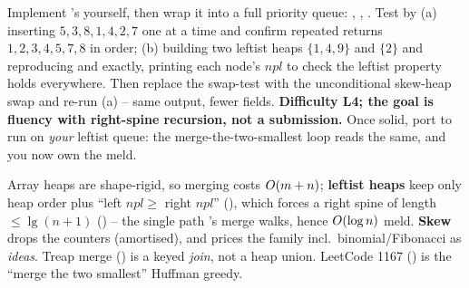 \begin{notebox}
Implement 's  yourself, then wrap it into a full priority queue:
, , . Test by (a) inserting $5,3,8,1,4,2,7$ one at a time and
confirm repeated  returns $1,2,3,4,5,7,8$ in order; (b) building two leftist heaps
$\{1,4,9\}$ and $\{2\}$ and reproducing  and  exactly, printing
each node's $\mathit{npl}$ to check the leftist property holds everywhere. Then replace the swap-test with
the unconditional skew-heap swap and re-run (a) -- same output, fewer fields. \textbf{Difficulty L4; the goal
is fluency with right-spine recursion, not a submission.} Once solid, port  to run on
\emph{your} leftist queue: the merge-the-two-smallest loop reads the same, and you now own the meld.
\end{notebox}

\begin{recallbox}
Array heaps are shape-rigid, so merging costs $O(m+n)$; \textbf{leftist heaps} keep only heap order plus
``left $\mathit{npl}\ge$ right $\mathit{npl}$'' (), which forces a right spine of length
$\le\lg(n+1)$ () -- the single path 's merge walks, hence
$O(\log n)$ meld. \textbf{Skew} drops the counters (amortised), and  prices the
family incl.\ binomial/Fibonacci as \emph{ideas}. Treap merge () is a keyed \emph{join},
not a heap union. LeetCode 1167 () is the ``merge the two smallest'' Huffman greedy.
\end{recallbox}

